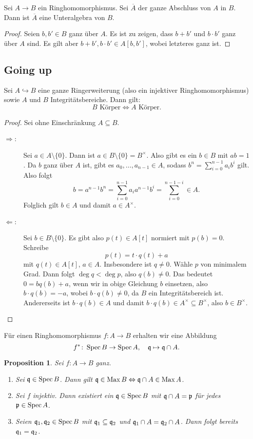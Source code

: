 \documentclass[12pt,a4paper]{scrartcl}
\theoremstyle{cplain}
\newtheorem{prop}[thmcounter]{Proposition}
\theoremstyle{cdef}
\begin{document}
\begin{kor}
	Sei $A\to B$ ein Ringhomomorphismus. Sei $\overline{A}$ der ganze Abschluss von $A$ in $B$. Dann ist $\overline{A}$ eine Unteralgebra von $B$.
\end{kor}
\begin{proof}
	Seien $b, b'\in B$ ganz über $A$. Es ist zu zeigen, dass $b+b'$ und $b\cdot b'$ ganz über $A$ sind. Es gilt aber $b+b', b\cdot b'\in A[b, b']$, wobei letzteres ganz ist.
\end{proof}

\subsection{Going up}
\begin{lem} \label{lem:6.7}
	Sei $A\hookrightarrow B$ eine ganze Ringerweiterung (also ein injektiver Ringhomomorphismus) sowie $A$ und $B$ Integritätsbereiche. Dann gilt: 
	\[B \text{ Körper}\Longleftrightarrow A\text{ Körper}.\]
\end{lem}
\begin{proof} Sei ohne Einschränkung $A\subseteq B$.
\begin{description}
	\item[\glqq$\Rightarrow$\grqq:] Sei $a\in A\setminus \{0\}$. Dann ist $a\in B\setminus\{0\} = B^{\times}$. Also gibt es ein $b\in B$ mit $ab = 1$. Da $b$ ganz über $A$ ist, gibt es $a_0,\dots, a_{n-1}\in A$, sodass $b^n = \sum_{i = 0}^{n-1}a_ib^i$ gilt. Also folgt
	\[ b = a^{n-1}b^n = \sum_{i = 0}^{n-1} a_ia^{n-1}b^i = \sum_{i = 0}^{n-1-i}\in A. \]
	Folglich gilt $b\in A$ und damit $a\in A^{\times}$.
	\item[\glqq$\Leftarrow$\grqq:] Sei $b\in B\setminus\{0\}$. Es gibt also $p(t) \in A[t]$ normiert mit $p(b) = 0$. Schreibe
	$$p(t) = t\cdot q(t) + a$$
	mit $q(t)\in A[t]$, $a\in A$. Insbesondere ist $q\neq 0$. Wähle $p$ von minimalem Grad. Dann folgt $\deg q < \deg p$, also $q(b) \neq 0$. Das bedeutet $0 = bq(b)+a$, wenn wir in obige Gleichung $b$ einsetzen, also $b\cdot q(b)  = -a$, wobei $b\cdot q(b) \neq 0$, da $B$ ein Integritätsbereich ist. Andererseits ist $b\cdot q(b) \in A$ und damit $b\cdot q(b) \in A^{\times}\subseteq B^{\times}$, also $b\in B^{\times}$.
	\qedhere
\end{description}	
\end{proof}
Für einen Ringhomomorphismus $f\colon A \to B$ erhalten wir eine Abbildung \[f^*\colon \operatorname{Spec} B\to \operatorname{Spec} A, \quad \mathfrak{q}\mapsto \mathfrak{q}\cap A.\]
\begin{prop} \label{prop:6.8}
	Sei $f\colon A \to B$ ganz.
	\begin{enumerate}
		\item Sei $\mathfrak{q}\in \operatorname{Spec} B$. Dann gilt $\mathfrak{q}\in \operatorname{Max} B \Leftrightarrow \mathfrak{q}\cap A\in \operatorname{Max} A$. \label{prop:6.8:i}
		\item Sei $f$ injektiv. Dann existiert ein $\mathfrak{q} \in \operatorname{Spec} B$ mit $\mathfrak{q}\cap A = \mathfrak{p}$ für jedes $\mathfrak{p} \in \operatorname{Spec} A$. \label{prop:6.8:ii}
		\item Seien $\mathfrak{q}_1,\mathfrak{q}_2\in\operatorname{Spec} B$ mit $\mathfrak{q}_1\subseteq \mathfrak{q}_2$ und $\mathfrak{q}_1\cap A = \mathfrak{q}_2\cap A$. Dann folgt bereits $\mathfrak{q}_1 = \mathfrak{q}_2$. \label{prop:6.8:iii}
	\end{enumerate}
\end{prop}
\end{document}
